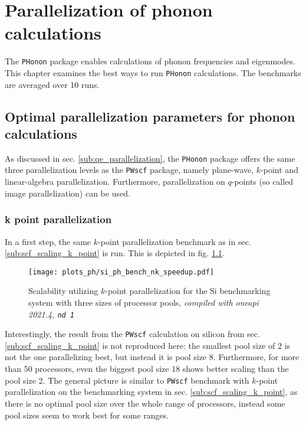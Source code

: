 \documentclass[main.tex]{subfiles}
\begin{document}
\chapter{Parallelization of phonon calculations}\label{ch:optimization_ph}

The \texttt{PHonon} package enables calculations of phonon frequencies and eigenmodes.
This chapter examines the best ways to run \texttt{PHonon} calculations.
The benchmarks are averaged over 10 runs.

\section{Optimal parallelization parameters for phonon calculations}

As discussed in sec. \ref{sub:qe_parallelization}, the \texttt{PHonon} package offers the same three parallelization levels as the \texttt{PWscf} package, namely plane-wave, \(k\)-point and linear-algebra parallelization.
Furthermore, parallelization on \(q\)-points (so called image parallelization) can be used.

\subsection{k point parallelization}

In a first step, the same \(k\)-point parallelization benchmark as in sec. \ref{sub:scf_scaling_k_point} is run. This is depicted in fig. \ref{fig:scaling_ph_nk_si}.

\begin{figure}[htb!]
    \centering
    \texttt{[image: plots\_ph/si\_ph\_bench\_nk\_speedup.pdf]}
    \caption{Scalability utilizing \(k\)-point parallelization for the Si benchmarking system with three sizes of processor pools, \emph{\QE compiled with \gls{oneapi} 2021.4, \texttt{nd 1}}}
    \label{fig:scaling_ph_nk_si}
\end{figure}
Interestingly, the result from the \texttt{PWscf} calculation on silicon from sec. \ref{sub:scf_scaling_k_point} is not reproduced here: the smallest pool size of 2 is not the one parallelizing best, but instead it is pool size 8.
Furthermore, for more than 50 processors, even the biggest pool size 18 shows better scaling than the pool size 2.
The general picture is similar to \texttt{PWscf} benchmark with \(k\)-point parallelization on the \TaS benchmarking system in sec. \ref{sub:scf_scaling_k_point}, as there is no optimal pool size over the whole range of processors, instead some pool sizes seem to work best for some ranges.
\end{document}
